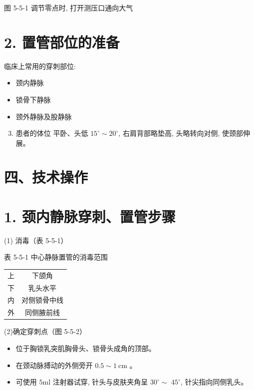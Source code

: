 \documentclass[10pt]{article}
\begin{document}
图 5-5-1 调节零点时, 打开测压口通向大气

\section*{2. 置管部位的准备}
临床上常用的穿刺部位:

\begin{itemize}
  \item 颈内静脉
  \item 锁骨下静脉
  \item 颈外静脉及股静脉
\end{itemize}

\begin{enumerate}
  \setcounter{enumi}{2}
  \item 患者的体位 平卧、头低 $15^{\circ} \sim 20^{\circ}$, 右肩背部略垫高, 头略转向对侧, 使颈部伸展。
\end{enumerate}

\section*{四、技术操作}
\section*{1. 颈内静脉穿刺、置管步骤}
(1) 消毒（表 5-5-1）

表 5-5-1 中心静脉置管的消毒范围

\begin{center}
\begin{tabular}{cc}
\hline
上 & 下颌角 \\
下 & 乳头水平 \\
内 & 对侧锁骨中线 \\
外 & 同侧腋前线 \\
\hline
\end{tabular}
\end{center}

(2)确定穿刺点（图 5-5-2）

\begin{itemize}
  \item 位于胸锁乳突肌胸骨头、锁骨头成角的顶部。
  \item 在颈动脉搏动的外侧旁开 $0.5 \sim 1 \mathrm{~cm}$ 。
  \item 可使用 $5 \mathrm{ml}$ 注射器试穿, 针头与皮肤夹角呈 $30^{\circ} \sim$ $45^{\circ}$, 针尖指向同侧乳头。
\end{itemize}
\end{document}
